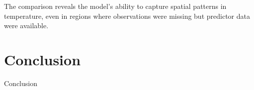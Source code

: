  The comparison reveals the model’s ability to capture spatial patterns in temperature, even in regions where observations were missing but predictor data were available.
 
 
\section{Conclusion}
Conclusion 






